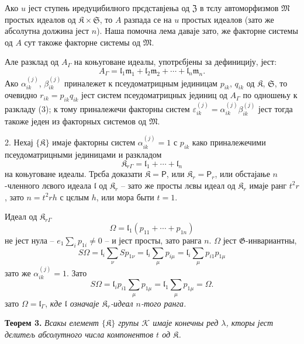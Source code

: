 \documentclass[11pt]{article}
\begin{document}
Ако \(u\) јест ступењ иредуцибилного прєдставјења од \(\mathfrak Z\) в тєлу автоморфизмов \(\mathfrak M\) простых идеалов од \(\mathfrak K\times\mathfrak S\), то \(A\) разпада се на \(u\) простых идеалов (зато же абсолутна должина јест \(n\)). Наша помочна лема даваје зато, же факторне системы од \(A\) сут такоже факторне системы од \(\mathfrak M\).

Але разклад од \(A_\Gamma\) на коњуговане идеалы, употрєбјены за дефиницију, јест:
\[
\tag{3}
A_\Gamma=\mathfrak l_1\mathfrak m_1+\mathfrak l_2\mathfrak m_2+\cdots+\mathfrak l_n\mathfrak m_n.
\]
Ако \(\alpha_{ik}^{(j)}\), \(\beta_{ik}^{(j)}\) приналежет к псеудоматрицным јединицам \(p_{ik}\), \(q_{ik}\) од \(\mathfrak K\), \(\mathfrak S\), то очевидно \(r_{ik}=p_{ik}q_{ik}\) јест систем псеудоматрицных јединиц од \(A_\Gamma\) по одношењу к разкладу (3); к тому приналежечи факторны систем \(\varepsilon_{ik}^{(j)}=\alpha_{ik}^{(j)}\beta_{ik}^{(j)}\) јест тогда такоже једен из факторных системов од \(\mathfrak M\).

2. Нехај \(\{\mathfrak K\}\) имаје факторны систем \(\alpha_{ik}^{(j)}=1\) с \(p_{ik}\) како приналежечими псеудоматрицными јединицами и разкладом
\[
\mathfrak K_{r\Gamma}=\mathfrak l_1+\cdots+\mathfrak l_n
\]
на коњуговане идеалы. Трєба доказати \(\mathfrak K=\mathsf P\), или \(\mathfrak K_r=\mathsf P_r\), или обстајање \(n\)-членного лєвого идеала \(\mathfrak l\) од \(\mathfrak K_r\) -- зато же просты лєвы идеал од \(\mathfrak K_r\) имаје ранг \(t^2r\), зато \(n=t^2rh\) с цєлым \(h\), или мора быти \(t=1\).

Идеал од \(\mathfrak K_{r\Gamma}\)
\[
\Omega=\mathfrak l_1(p_{11}+\cdots+p_{1n})
\]
не јест нула -- \(e_1\sum_i p_{1i}\ne0\) -- и јест просты, зато ранга \(n\). \(\Omega\) јест \(\mathfrak G\)-инвариантны,
\[
S\Omega
=\mathfrak l_i\sum_\nu S p_{1\nu}
=\mathfrak l_i\sum_\mu p_{i\mu}
=\mathfrak l_i\sum_\mu p_{i1}p_{1\mu}
\]
зато же \(\alpha_{ik}^{(j)}=1\). Зато
\[
S\Omega=\mathfrak l_ip_{i1}\sum_\mu p_{1\mu}
=\mathfrak l_1\sum_\mu p_{1\mu}
=\Omega.
\]
зато \(\Omega=\mathfrak l_\Gamma\), \emph{кде \(\mathfrak l\) означаје \(\mathfrak K_r\)-идеал \(n\)-того ранга.}

\textbf{Теорем 3.} \emph{Всакы елемент \(\{\mathfrak K\}\) групы \(\mathscr K\) имаје конечны ред \(\lambda\), кторы јест дєлитељ абсолутного числа компонентов \(t\) од \(\mathfrak K\).}
\end{document}
